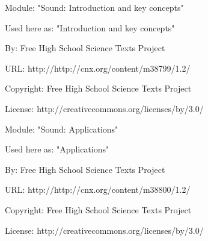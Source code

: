       \par\vspace{9pt}\noindent\begin{minipage}{\textwidth}
      Module: "Sound: Introduction and key concepts" \par\nopagebreak\noindent
      Used here as: "Introduction and key concepts" \par\nopagebreak\noindent
        By: Free High School Science Texts Project\par\nopagebreak\noindent
      URL: http://http://cnx.org/content/m38799/1.2/\par\nopagebreak\noindent
      \par\nopagebreak\noindent
      Copyright: Free High School Science Texts Project\par\nopagebreak\noindent
      License:  http://creativecommons.org/licenses/by/3.0/\par\nopagebreak\noindent
      \par\end{minipage}
      \par\vspace{9pt}\noindent\begin{minipage}{\textwidth}
      Module: "Sound: Applications" \par\nopagebreak\noindent
      Used here as: "Applications" \par\nopagebreak\noindent
        By: Free High School Science Texts Project\par\nopagebreak\noindent
      URL: http://http://cnx.org/content/m38800/1.2/\par\nopagebreak\noindent
      \par\nopagebreak\noindent
      Copyright: Free High School Science Texts Project\par\nopagebreak\noindent
      License:  http://creativecommons.org/licenses/by/3.0/\par\nopagebreak\noindent
      \par\end{minipage}
